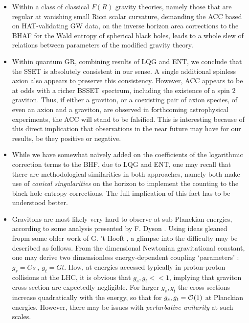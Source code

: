 \documentclass[11pt]{article}
\begin{document}
{\begin{itemize}
\item Within a class of classical $F(R)$ gravity theories, namely those that are regular at vanishing small Ricci scalar curvature, demanding the ACC based on HAT-validating GW data, on the inverse horizon area corrections to the BHAF for the Wald entropy of spherical black holes, leads to a whole slew of relations between parameters of the modified gravity theory. 
\item Within quantum GR, combining results of LQG and ENT, we conclude that the SSET is absolutely consistent in our sense. A single additional spinless axion also appears to preserve this consistency. However, ACC appears to be at odds with a richer BSSET spectrum, including the existence of a spin $2$ graviton. Thus, if either a graviton, or a coexisting pair of axion species, of even an axion and a graviton, are observed in forthcoming astrophysical experiments, the ACC will stand to be falsified. This is interesting because of this direct implication that observations in the near future may have for our results, be they positive or negative. 
\item While we have somewhat na\"ively added on the coefficients of the logarithmic correction terms to the BHF, due to LQG and ENT, one may recall that there are methodological similarities in both approaches, namely both make use of {\it conical singularities} on the horizon to implement the counting to the black hole entropy corrections. The full implication of this fact has to be understood better. 
\item Gravitons are most likely very hard to observe at sub-Planckian energies, according to some analysis presented by F. Dyson \cite{dys2013}. Using ideas gleaned fropm some older work of G. 't Hooft \cite{thf1997}, a glimpse into the difficulty may be described as follows. From the dimensional Newtonian gravitational constant, one may derive two dimensionless energy-dependent coupling `parameters' : $g_s = Gs~,~ g_t = Gt$. How, at energies accessed typically in proton-proton collisions at the LHC, it is obvious that $g_s,g_t << 1$, implying that graviton cross section are expectedly negligible. For larger $g_s, g_t$ the cross-sections increase quadratically with the energy, so that for $g_s, g_t = {\cal O}(1) $ at Planckian energies. However, there may be issues with {\it perturbative unitarity} at such scales.  
\end{itemize}


}
\end{document}
